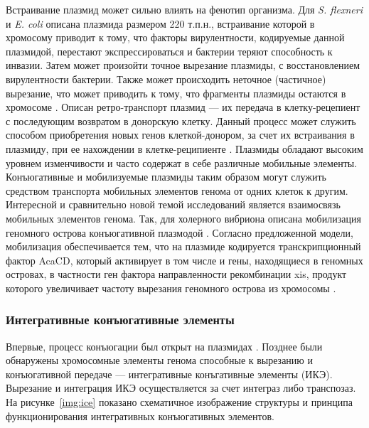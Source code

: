 Встраивание плазмид может сильно влиять на фенотип организма. Для \textit{S. flexneri} и \textit{E. coli} описана плазмида размером 220 т.п.н., встраивание которой в хромосому приводит к тому, что факторы вирулентности, кодируемые данной плазмидой, перестают экспрессироваться и бактерии теряют способность к инвазии. Затем может произойти точное вырезание плазмиды, с восстановлением вирулентности бактерии. Также может происходить неточное (частичное) вырезание, что может приводить к тому, что фрагменты плазмиды остаются в хромосоме \cite{myers2006role}. Описан ретро-транспорт плазмид --- их передача в клетку-рецепиент с последующим возвратом в донорскую клетку. Данный процесс может служить способом приобретения новых генов клеткой-донором, за счет их встраивания в плазмиду, при ее нахождении в клетке-реципиенте \cite{ronchel2000retrotransfer}. Плазмиды обладают высоким уровнем изменчивости и часто содержат в себе различные мобильные элементы. Конъюгативные и мобилизуемые плазмиды таким образом могут служить средством транспорта мобильных элементов генома от одних клеток к другим. Интересной и сравнительно новой темой исследований является взаимосвязь мобильных элементов генома. Так, для холерного вибриона описана мобилизация геномного острова конъюгативной плазмодой \cite{carraro2016inca}. Согласно предложенной модели, мобилизация обеспечивается тем, что на плазмиде кодируется транскрипционный фактор AcaCD, который активирует в том числе и гены, находящиеся в геномных островах, в частности ген фактора направленности рекомбинации xis, продукт которого увеличивает частоту вырезания геномного острова из хромосомы \cite{carraro2017mobilizable}. 

\subsubsection{Интегративные конъюгативные элементы}
Впервые, процесс конъюгации был открыт на плазмидах \cite{lederberg1946gene}. Позднее были обнаружены хромосомные элементы генома способные к вырезанию и конъюгативной передаче --- интегративные конъгативные элементы (ИКЭ)\cite{burrus2002icest1}. Вырезание и интеграция ИКЭ осуществляется за счет интеграз либо транспозаз. На рисунке~\ref{img:ice} показано схематичное изображение структуры и принципа функционирования интегративных конъюгативных элементов. 

